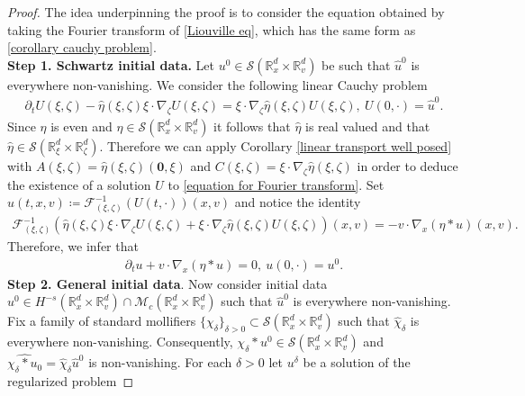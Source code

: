 \documentclass[11pt,reqno]{amsart}
\numberwithin{equation}{section}
\begin{document}
\begin{proof}
The idea underpinning the proof is to consider the equation obtained by taking the Fourier transform of \eqref{Liouville eq}, which has the same form as \eqref{corollary cauchy problem}. \\
\textbf{Step 1. Schwartz initial data.} Let $u^{0}\in \mathcal{S}(\mathbb{R}^{d}_{x}\times \mathbb{R}^{d}_{v})$ be such that $\widehat{u}^{0}$ is everywhere non-vanishing. We consider the following linear Cauchy problem 
\begin{align}
\partial_{t}U(\xi,\zeta)-\widehat{\eta}(\xi,\zeta)\xi\cdot \nabla_{\zeta}U(\xi,\zeta)=\xi\cdot \nabla_{\zeta}\widehat{\eta} (\xi,\zeta) U(\xi,\zeta),  \ U(0,\cdot)=\widehat{u}^{0}. \label{equation for Fourier transform} 
\end{align}
Since $\eta$ is even and $\eta \in \mathcal{S}(\mathbb{R}^{d}_{x}\times \mathbb{R}^{d}_{v})$ it follows that $\widehat{\eta}$ is real valued and that  $\widehat{\eta}\in \mathcal{S}(\mathbb{R}^{d}_{\xi}\times \mathbb{R}^{d}
_{\zeta})$. Therefore we can apply Corollary \ref{linear transport well posed} with $A(\xi,\zeta)=\widehat{\eta}(\xi,\zeta)(\mathbf{0},\xi)$ and $C(\xi,\zeta)=\xi\cdot \nabla_{\zeta}\widehat{\eta}(\xi,\zeta)$ in order to deduce the existence of a solution $U$ to \eqref{equation for Fourier transform}. Set  $u(t,x,v)\coloneqq \mathcal{F}^{-1}_{(\xi,\zeta)}(U(t,\cdot))(x,v)$ and notice  the identity 
\begin{align*}
\mathcal{F}^{-1}_{(\xi,\zeta)}(\widehat{\eta}(\xi,\zeta)\xi\cdot \nabla_{\zeta}U(\xi,\zeta)+\xi\cdot \nabla_{\zeta}\widehat{\eta}(\xi,\zeta)U(\xi,\zeta))(x,v)=-v\cdot \nabla_{x}(\eta\ast u)(x,v). \end{align*}
Therefore, we infer that 
\begin{align*}
\partial_{t}u+v\cdot \nabla_{x}(\eta\ast u)=0,\ u(0,\cdot)=u^{0}.     
\end{align*}
\textbf{Step 2. General initial data}. Now consider initial data $u
^{0}\in H^{-s}(\mathbb{R}^{d}_{x}\times \mathbb{R}^{d}_{v})\cap \mathcal{M}_{c}(\mathbb{R}^{d}_{x}\times \mathbb{R}^{d}_{v})$ such that $\widehat{u}^{0}$ is everywhere non-vanishing. Fix a family of standard mollifiers $\{\chi_{\delta}\}_{\delta>0}\subset \mathcal{S}(\mathbb{R}^{d}_{x}\times \mathbb{R}^{d}_{v})$ such that $\widehat{\chi}_{\delta}$ is everywhere non-vanishing. Consequently, $\chi_{\delta}\ast u^{0}\in \mathcal{S}(\mathbb{R}^{d}_{x}\times \mathbb{R}^{d}_{v})$ and  $\widehat{\chi_{\delta}\ast u_{0}}=\widehat{\chi}_{\delta}\widehat{u}^{0}$ is non-vanishing. For each $\delta>0$ let  $u^{\delta}$ be a solution of the regularized problem 

\end{proof}
\end{document}
